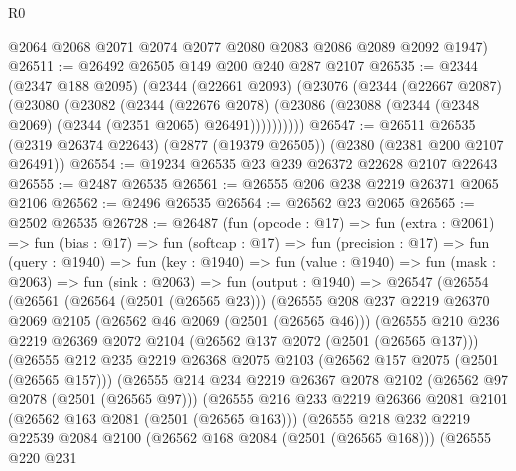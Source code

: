 \begin{lexlean}{R0}
\begin{coremodule}
      @2064
      @2068
      @2071
      @2074
      @2077
      @2080
      @2083
      @2086
      @2089
      @2092
      @1947)
@26511 := @26492 @26505 @149 @200 @240 @287 @2107
@26535 := @2344
    (@2347 @188 @2095)
    (@2344
      (@22661 @2093)
      (@23076
        (@2344
          (@22667 @2087)
          (@23080
            (@23082
              (@2344
                (@22676 @2078)
                (@23086 (@23088 (@2344 (@2348 @2069) (@2344 (@2351 @2065) @26491))))))))))
@26547 := @26511
    @26535
    (@2319 @26374 @22643)
    (@2877 (@19379 @26505))
    (@2380 (@2381 @200 @2107 @26491))
@26554 := @19234 @26535 @23 @239 @26372 @22628 @2107 @22643
@26555 := @2487 @26535
@26561 := @26555 @206 @238 @2219 @26371 @2065 @2106
@26562 := @2496 @26535
@26564 := @26562 @23 @2065
@26565 := @2502 @26535
@26728 := @26487
    (fun (opcode : @17) =>
    fun (extra : @2061) =>
    fun (bias : @17) =>
    fun (softcap : @17) =>
    fun (precision : @17) =>
    fun (query : @1940) =>
    fun (key : @1940) =>
    fun (value : @1940) =>
    fun (mask : @2063) =>
    fun (sink : @2063) =>
    fun (output : @1940) =>
    @26547
      (@26554
        (@26561
          (@26564 (@2501 (@26565 @23)))
          (@26555
            @208
            @237
            @2219
            @26370
            @2069
            @2105
            (@26562 @46 @2069 (@2501 (@26565 @46)))
            (@26555
              @210
              @236
              @2219
              @26369
              @2072
              @2104
              (@26562 @137 @2072 (@2501 (@26565 @137)))
              (@26555
                @212
                @235
                @2219
                @26368
                @2075
                @2103
                (@26562 @157 @2075 (@2501 (@26565 @157)))
                (@26555
                  @214
                  @234
                  @2219
                  @26367
                  @2078
                  @2102
                  (@26562 @97 @2078 (@2501 (@26565 @97)))
                  (@26555
                    @216
                    @233
                    @2219
                    @26366
                    @2081
                    @2101
                    (@26562 @163 @2081 (@2501 (@26565 @163)))
                    (@26555
                      @218
                      @232
                      @2219
                      @22539
                      @2084
                      @2100
                      (@26562 @168 @2084 (@2501 (@26565 @168)))
                      (@26555
                        @220
                        @231

\end{coremodule}
\end{lexlean}
